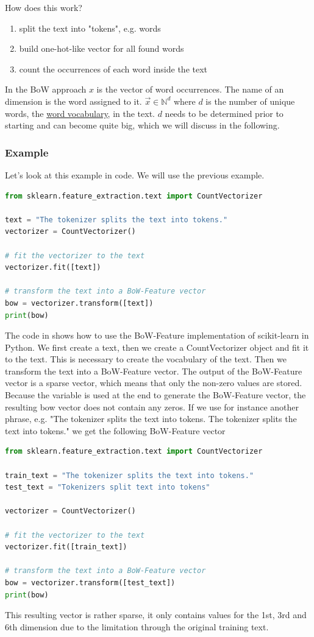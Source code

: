 How does this work?
\begin{enumerate}
  \item split the text into "tokens", e.g. words
  \item build one-hot-like vector for all found words
  \item count the occurrences of each word inside the text
\end{enumerate}
In the BoW approach $x$ is the vector of word occurrences. The name of an dimension is the word assigned to it.
$\vec{x} \in \mathbb{N}^d$ where $d$ is the number of unique words, the \underline{word vocabulary}, in the text.
$d$ needs to be determined prior to starting and can become quite big, which we will discuss in the following.
\subsubsection{Example}
Let's look at this example in code. We will use the previous example.
\begin{lstlisting}[language=Python, caption={BoW-Features in Python}, label={code:bow}]
from sklearn.feature_extraction.text import CountVectorizer

text = "The tokenizer splits the text into tokens."
vectorizer = CountVectorizer()

# fit the vectorizer to the text
vectorizer.fit([text])

# transform the text into a BoW-Feature vector
bow = vectorizer.transform([text])
print(bow)
\end{lstlisting}
The code in  shows how to use the BoW-Feature implementation of scikit-learn in Python.
We first create a text, then we create a CountVectorizer object and fit it to the text.
This is necessary to create the vocabulary of the text.
Then we transform the text into a BoW-Feature vector.
The output of the BoW-Feature vector is a sparse vector, which means that only the non-zero values are stored.
Because the  variable is used at the end to generate the BoW-Feature vector, the resulting bow vector does not contain any zeros.
If we use for instance another phrase, e.g. "The tokenizer splits the text into tokens. The tokenizer splits the text into tokens." we get the following BoW-Feature vector
\begin{lstlisting}[language=Python, caption={BoW-Features in Python}, label={code:bow}]
from sklearn.feature_extraction.text import CountVectorizer

train_text = "The tokenizer splits the text into tokens."
test_text = "Tokenizers split text into tokens"

vectorizer = CountVectorizer()

# fit the vectorizer to the text
vectorizer.fit([train_text])

# transform the text into a BoW-Feature vector
bow = vectorizer.transform([test_text])
print(bow)
\end{lstlisting}
This resulting vector is rather sparse, it only contains values for the 1st, 3rd and 6th dimension due to the limitation through the original training text.

